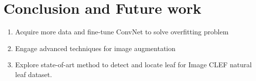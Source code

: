 \documentclass[journal, 10pt]{IEEEtran}
\begin{document}
\section{Conclusion and Future work}
  \begin{enumerate}
    \item Acquire more data and fine-tune ConvNet to solve overfitting problem
    \item Engage advanced techniques for image augmentation
    \item Explore state-of-art method to detect and locate leaf for Image CLEF natural leaf dataset.
  \end{enumerate}



%


\appendices





\ifCLASSOPTIONcaptionsoff
  \newpage
\fi
\end{document}
